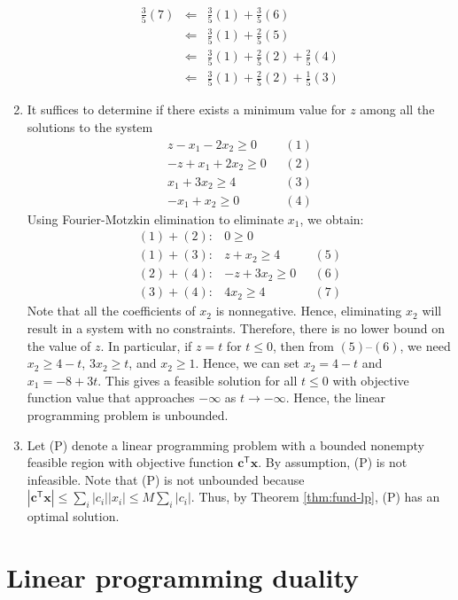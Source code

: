 \documentclass[]{book}
\newcommand{\T}{\mathsf{T}}
\renewcommand{\vec}[1]{\mathbf{#1}}
\theoremstyle{definition}
\theoremstyle{definition}
\theoremstyle{remark}
\begin{document}
\begin{enumerate}
  \begin{eqnarray*}
  \frac{3}{5} (7)
  & \Leftarrow & \frac{3}{5} (1) + \frac{3}{5} (6) \\
  & \Leftarrow & \frac{3}{5} (1) + \frac{2}{5} (5) \\
  & \Leftarrow & \frac{3}{5} (1) + \frac{2}{5} (2) + \frac{2}{5} (4)  \\
  & \Leftarrow & \frac{3}{5} (1) + \frac{2}{5} (2) + \frac{1}{5} (3)
  \end{eqnarray*}
\item
  It suffices to determine if there exists a minimum value for \(z\)
  among all the solutions to the system \[
  \begin{array}{rl}
  z-  x_1 - 2x_2 \geq 0 & ~~~(1) \\
  -z+  x_1 + 2x_2 \geq 0 &  ~~~(2)\\
  x_1 + 3x_2   \geq 4 &  ~~~(3)\\
  -x_1 + x_2  \geq 0 & ~~~(4)
  \end{array}
  \] Using Fourier-Motzkin elimination to eliminate \(x_1\), we obtain:
  \[
  \begin{array}{rrl}
  (1) + (2): &  0 \geq 0 \\
  (1) + (3): & z +  x_2 \geq 4 &  ~~~(5)\\
  (2) + (4): & - z + 3x_2 \geq 0 & ~~~(6) \\
  (3) + (4): & 4x_2 \geq 4 & ~~~(7)
  \end{array}
  \] Note that all the coefficients of \(x_2\) is nonnegative. Hence,
  eliminating \(x_2\) will result in a system with no constraints.
  Therefore, there is no lower bound on the value of \(z\). In
  particular, if \(z = t\) for \(t\leq 0\), then from \((5)\)--\((6)\),
  we need \(x_2 \geq 4-t\), \(3x_2 \geq t\), and \(x_2 \geq 1\). Hence,
  we can set \(x_2 = 4-t\) and \(x_1 = -8+3t\). This gives a feasible
  solution for all \(t \leq 0\) with objective function value that
  approaches \(-\infty\) as \(t \rightarrow -\infty\). Hence, the linear
  programming problem is unbounded.
\item
  Let (P) denote a linear programming problem with a bounded nonempty
  feasible region with objective function \(\vec{c}^\T\vec{x}\). By
  assumption, (P) is not infeasible. Note that (P) is not unbounded
  because
  \(|\vec{c}^\T\vec{x}| \leq \sum_{i} |c_i||x_i| \leq M \sum_{i} |c_i| \).
  Thus, by Theorem \ref{thm:fund-lp}, (P) has an optimal solution.
\end{enumerate}

\chapter{Linear programming duality}\label{linear-programming-duality}
\end{document}

